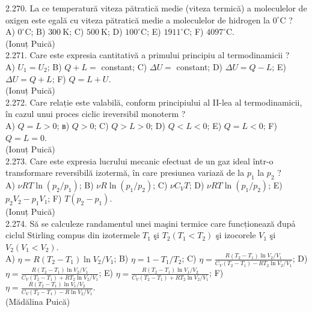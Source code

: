 2.270. La ce temperatură viteza pătratică medie (viteza termică) a moleculelor de oxigen este egală cu viteza pătratică medie a moleculelor de hidrogen la $0^{\circ} \mathrm{C}$ ?\\ A) $0^{\circ} \mathrm{C}$; B) $300 \mathrm{~K}$; C) $500 \mathrm{~K}$; D) $100^{\circ} \mathrm{C}$; E) $1911^{\circ} \mathrm{C}$; F) $4097^{\circ} \mathrm{C}$.\\ (Ionuț Puică)\\

2.271. Care este expresia cantitativă a primului principiu al termodinamicii ?\\ A) $U_{1}=U_{2}$; B) $Q+L=$ constant; C) $\Delta U=$ constant; D) $\Delta U=Q-L$; E) $\Delta U=Q+L$; F) $Q=L+U$.\\ (Ionuț Puică)\\

2.272. Care relație este valabilă, conform principiului al II-lea al termodinamicii, în cazul unui proces ciclic ireversibil monoterm ?\\ A) $Q=L>0$; в) $Q>0$; C) $Q>L>0$; D) $Q<L<0$; E) $Q=L<0$; F) $Q=L=0$.\\ (Ionuț Puică)\\

2.273. Care este expresia lucrului mecanic efectuat de un gaz ideal într-o transformare reversibilă izotermă, în care presiunea variază de la $p_{1}$ la $p_{2}$ ?\\ A) $\nu R T \ln \left(p_{2} / p_{1}\right)$; B) $\nu R \ln \left(p_{1} / p_{2}\right)$; C) $\nu C_{V} T$; D) $\nu R T \ln \left(p_{1} / p_{2}\right)$; E) $p_{2} V_{2}-p_{1} V_{1}$; F) $T\left(p_{2}-p_{1}\right)$.\\ (Ionuț Puică)\\

2.274. Să se calculeze randamentul unei maşini termice care funcționează đupả ciclul Stirling compus din izotermele $T_{1}$ şi $T_{2}\left(T_{1}<T_{2}\right)$ şi izocorele $V_{1}$ şi $V_{2}\left(V_{1}<V_{2}\right)$.\\ A) $\eta=R\left(T_{2}-T_{1}\right) \ln V_{2} / V_{1}$; B) $\eta=1-T_{1} / T_{2}$; C) $\eta=\frac{R\left(T_{2}-T_{1}\right) \ln V_{2} / V_{1}}{C_{V}\left(T_{2}-T_{1}\right)-R T_{2} \ln V_{2} / V_{1}}$; D) $\eta=\frac{R\left(T_{2}-T_{1}\right) \ln V_{2} / V_{1}}{C_{V}\left(T_{2}-T_{1}\right)+R T_{2} \ln V_{2} / V_{1}}$; E) $\eta=\frac{R\left(T_{2}-T_{1}\right) \ln V_{1} / V_{2}}{C_{V}\left(T_{2}-T_{1}\right)+R T_{2} \ln V_{2} / V_{1}}$; F) $\eta=\frac{R\left(T_{2}-T_{1}\right) \ln V_{1} / V_{2}}{C_{V}\left(T_{2}-T_{1}\right)-R \ln V_{2} / V_{1}}$.\\ (Mădălina Puică)\\

